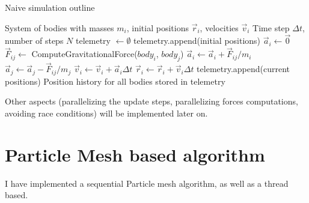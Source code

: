 \documentclass{article}
\begin{document}
\begin{algorithm}[H]
    \caption{Naive simulation outline}\label{alg:cap}
    \begin{algorithmic}
        \Require System of bodies with masses $m_i$, initial positions $\vec{r}_i$, velocities $\vec{v}_i$
        \Require Time step $\Delta t$, number of steps $N$
        \State telemetry $\gets \emptyset$
        \State telemetry.append(initial positions)
                \State $\vec{a}_i \gets \vec{0}$ 
            \EndFor
                    \State $\vec{F}_{ij} \gets$ ComputeGravitationalForce($body_i$, $body_j$)
                    \State $\vec{a}_i \gets \vec{a}_i + \vec{F}_{ij}/m_i$
                    \State $\vec{a}_j \gets \vec{a}_j - \vec{F}_{ij}/m_j$
                \EndFor
            \EndFor
                \State $\vec{v}_i \gets \vec{v}_i + \vec{a}_i\Delta t$ 
                \State $\vec{r}_i \gets \vec{r}_i + \vec{v}_i\Delta t$ 
            \EndFor
            \State telemetry.append(current positions)
        \EndFor
        \Ensure Position history for all bodies stored in telemetry
    \end{algorithmic}
\end{algorithm}

Other aspects (parallelizing the update steps, parallelizing forces computations, avoiding race conditions) will be implemented later on.

\section{Particle Mesh based algorithm}

I have implemented a sequential Particle mesh algorithm, as well as a thread based. 
\end{document}
